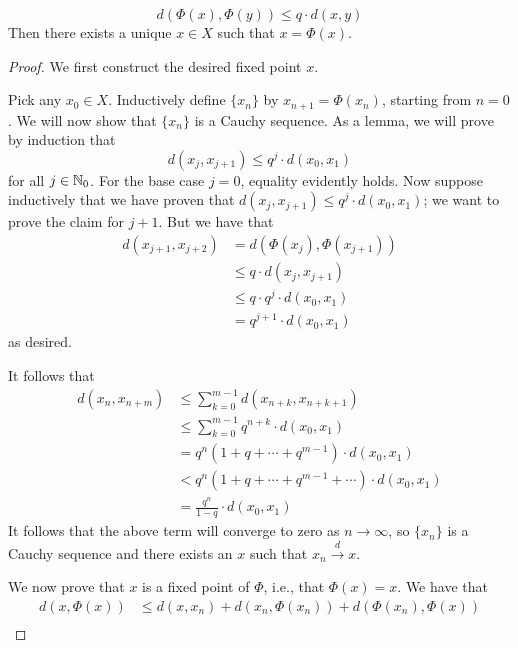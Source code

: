\documentclass[../notes.tex]{subfiles}
\begin{document}
\begin{itemize}
    \begin{equation*}
        d(\Phi(x),\Phi(y)) \leq q\cdot d(x,y)
    \end{equation*}
    Then there exists a unique $x\in X$ such that $x=\Phi(x)$.
    \begin{proof}
        We first construct the desired fixed point $x$.\par
        Pick any $x_0\in X$. Inductively define $\{x_n\}$ by $x_{n+1}=\Phi(x_n)$, starting from $n=0$. We will now show that $\{x_n\}$ is a Cauchy sequence. As a lemma, we will prove by induction that
        \begin{equation*}
            d(x_j,x_{j+1}) \leq q^j\cdot d(x_0,x_1)
        \end{equation*}
        for all $j\in\mathbb{N}_0$. For the base case $j=0$, equality evidently holds. Now suppose inductively that we have proven that $d(x_j,x_{j+1})\leq q^j\cdot d(x_0,x_1)$; we want to prove the claim for $j+1$. But we have that
        \begin{align*}
            d(x_{j+1},x_{j+2}) &= d(\Phi(x_j),\Phi(x_{j+1}))\\
            &\leq q\cdot d(x_j,x_{j+1})\\
            &\leq q\cdot q^j\cdot d(x_0,x_1)\\
            &= q^{j+1}\cdot d(x_0,x_1)
        \end{align*}
        as desired.\par
        It follows that
        \begin{align*}
            d(x_n,x_{n+m}) &\leq \sum_{k=0}^{m-1}d(x_{n+k},x_{n+k+1})\tag*{Triangle inequality}\\
            &\leq \sum_{k=0}^{m-1}q^{n+k}\cdot d(x_0,x_1)\tag*{Lemma}\\
            &= q^n(1+q+\cdots+q^{m-1})\cdot d(x_0,x_1)\\
            &< q^n(1+q+\cdots+q^{m-1}+\cdots)\cdot d(x_0,x_1)\\
            &= \frac{q^n}{1-q}\cdot d(x_0,x_1)
        \end{align*}
        It follows that the above term will converge to zero as $n\to\infty$, so $\{x_n\}$ is a Cauchy sequence and there exists an $x$ such that $x_n\xrightarrow{d}x$.\par\smallskip
        We now prove that $x$ is a fixed point of $\Phi$, i.e., that $\Phi(x)=x$. We have that
        \begin{align*}
            d(x,\Phi(x)) &\leq d(x,x_n)+d(x_n,\Phi(x_n))+d(\Phi(x_n),\Phi(x))\\

\end{align*}
\end{proof}
\end{itemize}
\end{document}
